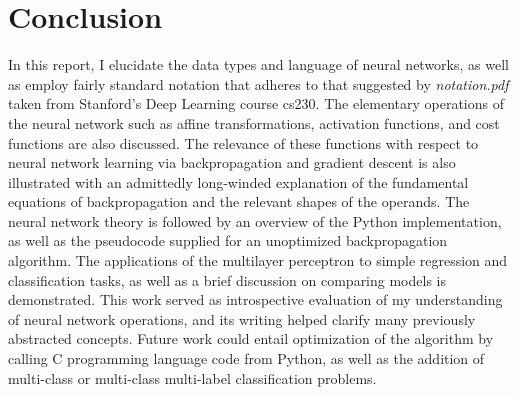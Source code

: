 \documentclass{article}
\begin{document}
\section{Conclusion}

In this report, I elucidate the data types and language of neural networks, as
well as employ fairly standard notation that adheres to that suggested by
\textit{notation.pdf} taken from Stanford's Deep Learning course cs230. The
elementary operations of the neural network such as affine transformations,
activation functions, and cost functions are also discussed. The relevance of
these functions with respect to neural network learning via backpropagation
and gradient descent is also illustrated with an admittedly long-winded explanation
of the fundamental equations of backpropagation and the relevant shapes of the
operands. The neural network theory is followed by an overview of the Python
implementation, as well as the pseudocode supplied for an unoptimized
backpropagation algorithm. The applications of the multilayer perceptron to
simple regression and classification tasks, as well as a brief discussion on
comparing models is demonstrated. This work served as introspective evaluation
of my understanding of neural network operations, and its writing helped
clarify many previously abstracted concepts. Future work could entail
optimization of the algorithm by calling C programming language code from Python,
as well as the addition of multi-class or multi-class multi-label classification
problems.

\pagebreak
\printbibliography
\end{document}
